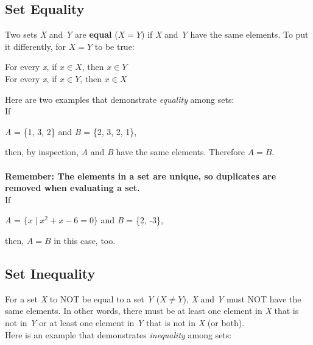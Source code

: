 \subsection*{Set Equality}

Two sets \textit{X} and \textit{Y} are \textbf{equal} ($X = Y$) if \textit{X} and \textit{Y} have the same elements.  To put it differently, for $X = Y$ to be true:

\begin{center}
For every \textit{x}, if $x \in X$, then $x \in Y$\\
For every \textit{x}, if $x \in Y$, then $x \in X$
\end{center}

Here are two examples that demonstrate \textit{equality} among sets:\\

If

\begin{center}
\textit{A} = \{1, 3, 2\} and \textit{B} = \{2, 3, 2, 1\},
\end{center}

then, by inspection, \textit{A} and \textit{B} have the same elements. Therefore $A = B$.\\\\\textbf{Remember: The elements in a set are unique, so duplicates are removed when evaluating a set.}\\

If

\begin{center}
\textit{A} = $\{x \mid x^2 + x - 6 = 0 \}$ and \textit{B} = \{2, -3\},
\end{center}

then, $A = B$ in this case, too.\\

\subsection*{Set Inequality}

For a set \textit{X} to NOT be equal to a set \textit{Y} ($X \neq Y$), \textit{X} and \textit{Y} must NOT have the same elements.  In other words, there must be at least one element in \textit{X} that is not in \textit{Y} or at least one element in \textit{Y} that is not in \textit{X} (or both).\\

Here is an example that demonstrates \textit{inequality} among sets:\\

